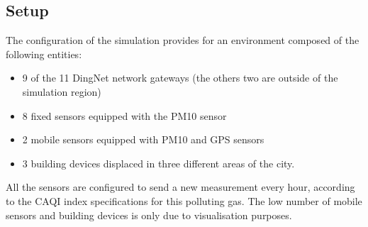 \subsection{Setup}
The configuration of the simulation provides for an environment composed of the following entities:
\begin{itemize}
    \item 9 of the 11 DingNet network gateways (the others two are outside of the simulation region)
    \item 8 fixed sensors equipped with the PM10 sensor
    \item 2 mobile sensors equipped with PM10 and GPS sensors
    \item 3 building devices displaced in three different areas of the city.
\end{itemize}
All the sensors are configured to send a new measurement every hour, according to the CAQI index specifications for this polluting gas.
The low number of mobile sensors and building devices is only due to visualisation purposes. 

